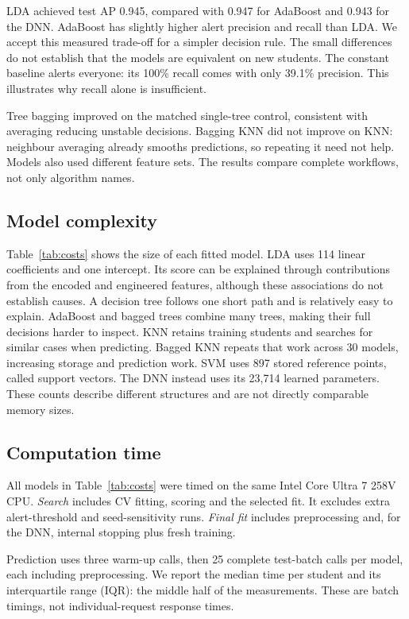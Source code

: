LDA achieved test AP 0.945, compared with 0.947 for AdaBoost and 0.943 for the
DNN. AdaBoost has slightly higher alert precision and recall than LDA.
We accept this measured trade-off for a simpler decision rule. The small
differences do not establish that the models are equivalent on new students.
The constant baseline alerts everyone: its 100\% recall comes with only 39.1\%
precision. This illustrates why recall alone is insufficient.

Tree bagging improved on the matched single-tree control, consistent with
averaging reducing unstable decisions. Bagging KNN did not improve on KNN:
neighbour averaging already smooths predictions, so repeating it need not help.
Models also used different feature sets. The results compare complete workflows,
not only algorithm names.
\subsection{Model complexity}
Table~\ref{tab:costs} shows the size of each fitted model. LDA uses 114 linear
coefficients and one intercept.
Its score can be explained through contributions from the encoded and
engineered features, although these associations do not establish causes.
A decision tree follows
one short path and is relatively easy to explain. AdaBoost and bagged trees
combine many trees, making their full decisions harder to inspect. KNN retains
training students and searches for similar cases when predicting. Bagged KNN
repeats that work across 30 models, increasing storage and prediction work.
SVM uses 897 stored reference points, called support vectors. The DNN instead
uses its 23,714 learned parameters. These counts describe different structures
and are not directly comparable memory sizes.

\subsection{Computation time}
All models in Table~\ref{tab:costs} were timed on the same Intel Core Ultra 7 258V CPU.
\emph{Search} includes CV fitting, scoring and the selected fit. It excludes
extra alert-threshold and seed-sensitivity runs. \emph{Final fit} includes
preprocessing and, for the DNN, internal stopping plus fresh training.

Prediction uses three warm-up calls, then 25 complete test-batch calls per
model, each including preprocessing. We report the median time per student
and its interquartile range (IQR): the middle half of the measurements.
These are batch timings, not individual-request response times.

